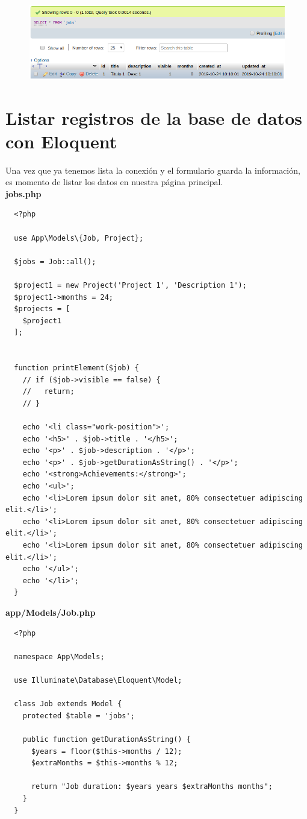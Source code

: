 \documentclass{article}
\begin{document}
\begin{figure}[h!]
  \centering
  \includegraphics[scale=0.5]{./Pictures/090_registro_completado.png}
\end{figure}

\newpage

\section{Listar registros de la base de datos con Eloquent}%
Una vez que ya tenemos lista la conexión y el formulario guarda la información,
es momento de listar los datos en nuestra página principal.\\

\textbf{jobs.php}
\begin{verbatim}
  <?php

  use App\Models\{Job, Project};

  $jobs = Job::all();

  $project1 = new Project('Project 1', 'Description 1');
  $project1->months = 24;
  $projects = [
    $project1
  ];


  function printElement($job) {
    // if ($job->visible == false) {
    //   return;
    // }

    echo '<li class="work-position">';
    echo '<h5>' . $job->title . '</h5>';
    echo '<p>' . $job->description . '</p>';
    echo '<p>' . $job->getDurationAsString() . '</p>';
    echo '<strong>Achievements:</strong>';
    echo '<ul>';
    echo '<li>Lorem ipsum dolor sit amet, 80% consectetuer adipiscing elit.</li>';
    echo '<li>Lorem ipsum dolor sit amet, 80% consectetuer adipiscing elit.</li>';
    echo '<li>Lorem ipsum dolor sit amet, 80% consectetuer adipiscing elit.</li>';
    echo '</ul>';
    echo '</li>';
  }
\end{verbatim}

\textbf{app/Models/Job.php}
\begin{verbatim}
  <?php

  namespace App\Models;

  use Illuminate\Database\Eloquent\Model;

  class Job extends Model {
    protected $table = 'jobs';

    public function getDurationAsString() {
      $years = floor($this->months / 12);
      $extraMonths = $this->months % 12;

      return "Job duration: $years years $extraMonths months";
    }
  }
\end{verbatim}
\end{document}
